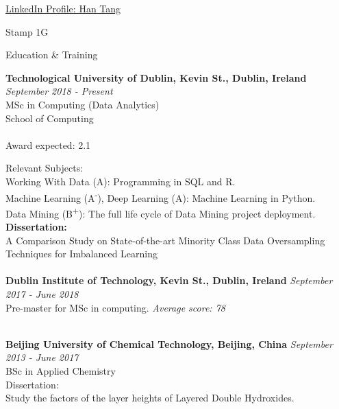 \documentclass{resume} %
\begin{document}
\centerline{\href{http://www.linkedin.com/in/han-tang-308a4117a}{LinkedIn Profile: Han Tang}}
\centerline{Stamp 1G}



\begin{rSection}{Education & Training}

{\bf Technological University of Dublin, Kevin St., Dublin, Ireland} \hfill {\em September 2018 - Present} 
\\ MSc in Computing (Data Analytics)
\\ School of Computing\\
\\Award expected: 2.1

Relevant Subjects: 
\\Working With Data (A): Programming in SQL and R.
\\Machine Learning (A\textsuperscript{-}),  Deep Learning (A): Machine Learning in Python.
\\Data Mining (B\textsuperscript{+}): The full life cycle of Data Mining project deployment.
\\ {\bf Dissertation:}
\\A Comparison Study on State-of-the-art Minority Class Data Oversampling Techniques for Imbalanced Learning
\\

\\{\bf Dublin Institute of Technology, Kevin St., Dublin, Ireland} \hfill {\em September 2017 - June 2018} 
\\ Pre-master for MSc in computing. \hfill {\em Average score: 78}


\\{\bf Beijing University of Chemical Technology, Beijing, China} \hfill {\em September 2013 - June 2017} 
\\ BSc in Applied Chemistry
\\Dissertation:
\\Study the factors of the layer heights of Layered Double Hydroxides.
\end{rSection}
\end{document}
